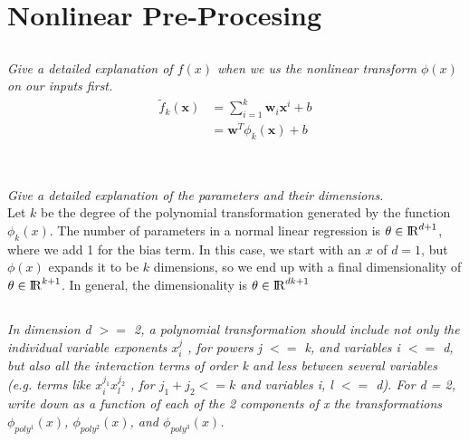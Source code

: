 \documentclass[reqno]{amsart}
\theoremstyle{definition}
\theoremstyle{remark}
\numberwithin{equation}{section}
\begin{document}
\section{Nonlinear Pre-Procesing}

\subsection{}

\textit{Give a detailed explanation of $f(x)$ when we us the nonlinear transform $\phi(x)$ on our inputs first.} \\

\begin{align}
     \widetilde{f}_k(\mathbf{x}) &= \sum_{i=1}^k \mathbf{w}_i \mathbf{x}^i +b \\ & =\mathbf{w}^{T}\phi_k(\mathbf{x}) + b
\end{align} \\

\subsection{}

\textit{Give a detailed explanation of the parameters and their dimensions.} \\

Let $k$ be the degree of the polynomial transformation generated by the function $\phi_k(x)$.
The number of parameters in a normal linear regression is $\theta \in {\rm I\!R}^{d+1}$, where we add 1
for the bias term. In this case, we start with an $x$ of $d=1$, but $\phi(x)$
expands it to be $k$ dimensions, so we end up with a final dimensionality of $\theta \in {\rm I\!R}^{k+1}$. In general, the dimensionality is $\theta \in {\rm I\!R}^{dk+1}$ \\

\subsection{}

\textit{In dimension d $>=$ 2, a polynomial transformation should include not
only the individual variable exponents $x_i^j$ , for powers j $<=$ k, and variables
i $<=$ d, but also all the interaction terms of order k and less
between several variables (e.g. terms like $x_i^{j_1} x_l^{j_2}$ , for $j_1 + j_2 <= k$ and variables i, l $<=$ d). For d = 2, write down as a function of each of
the 2 components of x the transformations $\phi_{poly^1}(x)$, $\phi_{poly^2}(x)$, and  $\phi_{poly^3}(x)$.} \\
\end{document}
